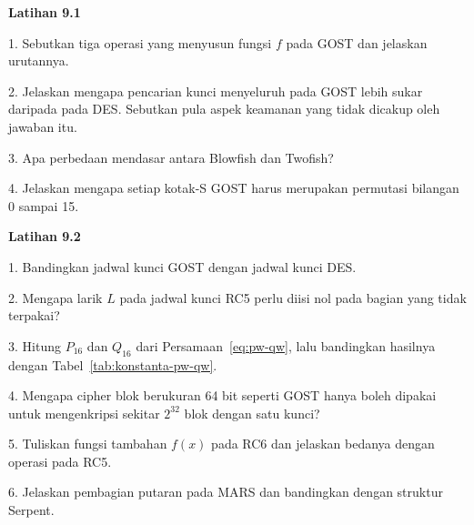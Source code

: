 
\begin{obereflection}
\textbf{Latihan 9.1}

1. Sebutkan tiga operasi yang menyusun fungsi $f$ pada GOST dan jelaskan
   urutannya.

2. Jelaskan mengapa pencarian kunci menyeluruh pada GOST lebih sukar daripada
   pada DES. Sebutkan pula aspek keamanan yang tidak dicakup oleh jawaban itu.

3. Apa perbedaan mendasar antara Blowfish dan Twofish?

4. Jelaskan mengapa setiap kotak-S GOST harus merupakan permutasi bilangan 0
   sampai 15.
\end{obereflection}

\begin{obereflection}
\textbf{Latihan 9.2}

1. Bandingkan jadwal kunci GOST dengan jadwal kunci DES.

2. Mengapa larik $L$ pada jadwal kunci RC5 perlu diisi nol pada bagian yang
   tidak terpakai?

3. Hitung $P_{16}$ dan $Q_{16}$ dari Persamaan~\eqref{eq:pw-qw}, lalu
   bandingkan hasilnya dengan Tabel~\ref{tab:konstanta-pw-qw}.

4. Mengapa cipher blok berukuran 64 bit seperti GOST hanya boleh dipakai untuk
   mengenkripsi sekitar $2^{32}$ blok dengan satu kunci?

5. Tuliskan fungsi tambahan $f(x)$ pada RC6 dan jelaskan bedanya dengan operasi
   pada RC5.

6. Jelaskan pembagian putaran pada MARS dan bandingkan dengan struktur Serpent.
\end{obereflection}
